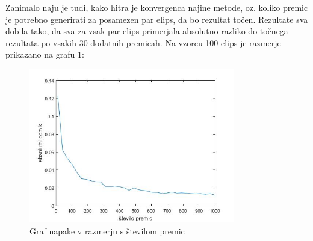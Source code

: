 \documentclass[a4paper]{article}
\begin{document}
Zanimalo naju je tudi, kako hitra je konvergenca najine metode, oz. koliko premic je potrebno generirati za posamezen par elips, da bo rezultat točen. Rezultate sva dobila tako, da sva za vsak par elips primerjala absolutno razliko do točnega rezultata po vsakih 30 dodatnih premicah. Na vzorcu 100 elips je razmerje prikazano na grafu 1: 

\begin{figure}[h]
\centering
\includegraphics[width=90mm]{graf_elipsa2.jpg}
\caption{Graf napake v razmerju s številom premic \label{overflow}}
\end{figure} 
\end{document}
